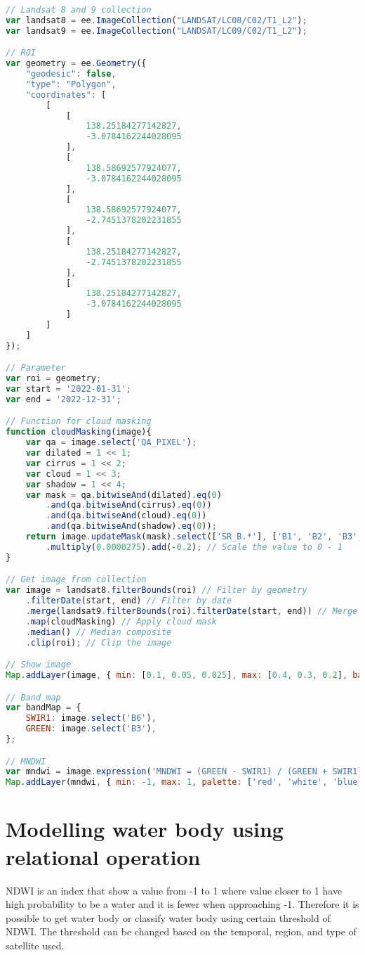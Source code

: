 \begin{lstlisting}[language=JavaScript, label={code:expression}, caption={GEE script to calculate NDWI from Landsat 8 and 9 composite}]
// Landsat 8 and 9 collection
var landsat8 = ee.ImageCollection("LANDSAT/LC08/C02/T1_L2");
var landsat9 = ee.ImageCollection("LANDSAT/LC09/C02/T1_L2");

// ROI
var geometry = ee.Geometry({
	"geodesic": false,
	"type": "Polygon",
	"coordinates": [
		[
			[
				138.25184277142827,
				-3.0784162244028095
			],
			[
				138.58692577924077,
				-3.0784162244028095
			],
			[
				138.58692577924077,
				-2.7451378202231855
			],
			[
				138.25184277142827,
				-2.7451378202231855
			],
			[
				138.25184277142827,
				-3.0784162244028095
			]
		]
	]
});

// Parameter
var roi = geometry;
var start = '2022-01-31';
var end = '2022-12-31';

// Function for cloud masking
function cloudMasking(image){
	var qa = image.select('QA_PIXEL');
	var dilated = 1 << 1;
	var cirrus = 1 << 2;
	var cloud = 1 << 3;
	var shadow = 1 << 4;
	var mask = qa.bitwiseAnd(dilated).eq(0)
		.and(qa.bitwiseAnd(cirrus).eq(0))
		.and(qa.bitwiseAnd(cloud).eq(0))
		.and(qa.bitwiseAnd(shadow).eq(0));
	return image.updateMask(mask).select(['SR_B.*'], ['B1', 'B2', 'B3', 'B4', 'B5', 'B6', 'B7']) // Select only important band
		.multiply(0.0000275).add(-0.2); // Scale the value to 0 - 1
}

// Get image from collection
var image = landsat8.filterBounds(roi) // Filter by geometry
	.filterDate(start, end) // Filter by date
	.merge(landsat9.filterBounds(roi).filterDate(start, end)) // Merge with landsat 9 collection
	.map(cloudMasking) // Apply cloud mask
	.median() // Median composite
	.clip(roi); // Clip the image

// Show image
Map.addLayer(image, { min: [0.1, 0.05, 0.025], max: [0.4, 0.3, 0.2], bands: ['B5', 'B6', 'B7'] }, 'Image');

// Band map
var bandMap = {
	SWIR1: image.select('B6'),
	GREEN: image.select('B3'),
};

// MNDWI
var mndwi = image.expression('MNDWI = (GREEN - SWIR1) / (GREEN + SWIR1)', bandMap);
Map.addLayer(mndwi, { min: -1, max: 1, palette: ['red', 'white', 'blue'] }, 'MNDWI');
\end{lstlisting}

\section{Modelling water body using relational operation}
NDWI is an index that show a value from -1 to 1 where value closer to 1 have high probability to be a water and it is fewer when approaching -1. Therefore it is possible to get water body or classify water body using certain threshold of NDWI. The threshold can be changed based on the temporal, region, and type of satellite used. 

